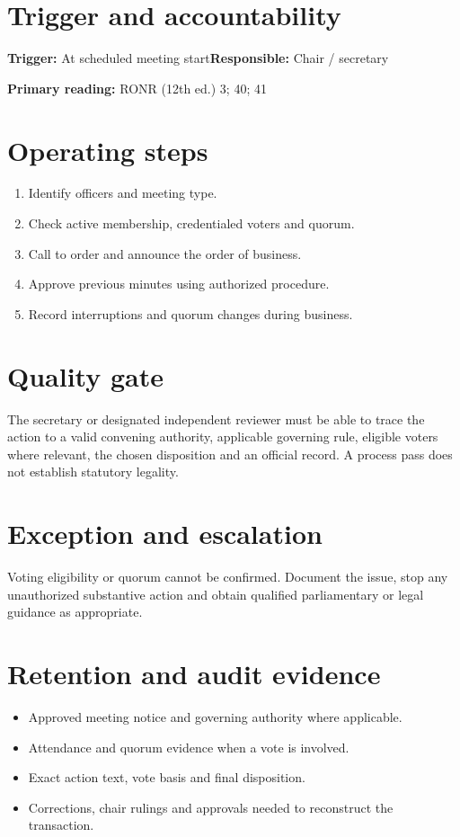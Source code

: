 \documentclass[11pt]{article}
\begin{document}
\SuiteOpen
{}
\section{Trigger and accountability}
\textbf{Trigger:} At scheduled meeting start\quad\textbf{Responsible:} Chair / secretary

\textbf{Primary reading:} RONR (12th ed.) 3; 40; 41

\section{Operating steps}
\begin{enumerate}[leftmargin=*,itemsep=4pt]
\item Identify officers and meeting type.
\item Check active membership, credentialed voters and quorum.
\item Call to order and announce the order of business.
\item Approve previous minutes using authorized procedure.
\item Record interruptions and quorum changes during business.
\end{enumerate}

\section{Quality gate}
The secretary or designated independent reviewer must be able to trace the action to a valid convening authority, applicable governing rule, eligible voters where relevant, the chosen disposition and an official record. A process pass does not establish statutory legality.

\section{Exception and escalation}
Voting eligibility or quorum cannot be confirmed. Document the issue, stop any unauthorized substantive action and obtain qualified parliamentary or legal guidance as appropriate.

\section{Retention and audit evidence}
\begin{itemize}[leftmargin=*,itemsep=4pt]
\item Approved meeting notice and governing authority where applicable.
\item Attendance and quorum evidence when a vote is involved.
\item Exact action text, vote basis and final disposition.
\item Corrections, chair rulings and approvals needed to reconstruct the transaction.
\end{itemize}
\end{document}

